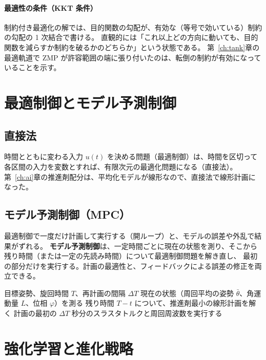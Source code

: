 \paragraph{最適性の条件（KKT 条件）}
制約付き最適化の解では、目的関数の勾配が、有効な（等号で効いている）制約の勾配の 1 次結合で書ける。
直観的には「これ以上どの方向に動いても、目的関数を減らすか制約を破るかのどちらか」という状態である。
第~\ref{ch:tank}章の最適軌道で ZMP が許容範囲の端に張り付いたのは、転倒の制約が有効になっていることを示す。

\section{最適制御とモデル予測制御}

\subsection{直接法}

時間とともに変わる入力 $u(t)$ を決める問題（最適制御）は、時間を区切って各区間の入力を変数とすれば、有限次元の最適化問題になる（直接法）。
第~\ref{ch:ai}章の推進剤配分は、平均化モデルが線形なので、直接法で線形計画になった。

\subsection{モデル予測制御（MPC）}

最適制御で一度だけ計画して実行する（開ループ）と、モデルの誤差や外乱で結果がずれる。
\textbf{モデル予測制御}は、一定時間ごとに現在の状態を測り、そこから残り時間（または一定の先読み時間）について最適制御問題を解き直し、
最初の部分だけを実行する。計画の最適性と、フィードバックによる誤差の修正を両立できる。

\begin{algorithm}[htbp]
\caption{モデル予測制御（第~\ref{ch:ai}章の推進剤配分）}
\begin{algorithmic}[1]
\Require 目標姿勢、旋回時間 $T$、再計画の間隔 $\Delta T$
  \State 現在の状態（周回平均の姿勢 $\bar\theta$、角運動量 $L$、位相 $\varphi$）を測る
  \State 残り時間 $T-t$ について、推進剤最小の線形計画を解く
  \State 計画の最初の $\Delta T$ 秒分のスラスタトルクと周回周波数を実行する
\EndFor
\end{algorithmic}
\end{algorithm}

\section{強化学習と進化戦略}

